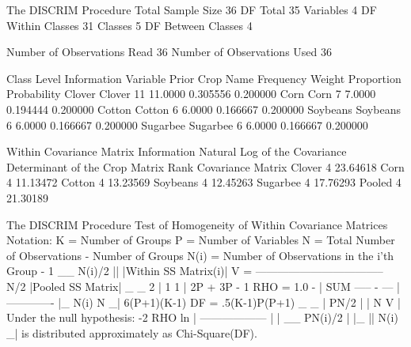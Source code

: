 \documentclass{article}
\begin{document}
\begin{Woutput}
The DISCRIM Procedure
Total Sample Size       36          DF Total                35
Variables                4          DF Within Classes       31
Classes                  5          DF Between Classes       4

Number of Observations Read             36
Number of Observations Used             36

                          Class Level Information
            Variable                                                  Prior
Crop        Name        Frequency       Weight    Proportion    Probability
Clover      Clover             11      11.0000      0.305556       0.200000
Corn        Corn                7       7.0000      0.194444       0.200000
Cotton      Cotton              6       6.0000      0.166667       0.200000
Soybeans    Soybeans            6       6.0000      0.166667       0.200000
Sugarbee    Sugarbee            6       6.0000      0.166667       0.200000

    Within Covariance Matrix Information
                           Natural Log of the
             Covariance    Determinant of the
Crop        Matrix Rank     Covariance Matrix
Clover                4              23.64618
Corn                  4              11.13472
Cotton                4              13.23569
Soybeans              4              12.45263
Sugarbee              4              17.76293
Pooled                4              21.30189

The DISCRIM Procedure
Test of Homogeneity of Within Covariance Matrices
Notation: K    = Number of Groups
          P    = Number of Variables
          N    = Total Number of Observations - Number of Groups
          N(i) = Number of Observations in the i'th Group - 1
                   __                       N(i)/2
                   ||  |Within SS Matrix(i)|
          V    = -----------------------------------
                                          N/2
                       |Pooled SS Matrix|
                        _                  _     2
                       |       1        1   |  2P + 3P - 1
          RHO  = 1.0 - | SUM -----  -  ---  | -------------
                       |_     N(i)      N  _|  6(P+1)(K-1)
          DF   = .5(K-1)P(P+1)
                                           _                  _
                                          |    PN/2            |
                                          |   N        V       |
Under the null hypothesis:      -2 RHO ln | ------------------ |
                                          |   __      PN(i)/2  |
                                          |_  ||  N(i)        _|
is distributed approximately as Chi-Square(DF).


\end{Woutput}
\end{document}
